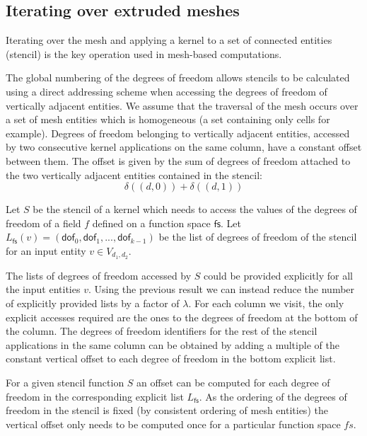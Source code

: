 \documentclass[11pt, a4paper]{scrartcl}
\begin{document}
\subsection{Iterating over extruded meshes}
\label{ssec:ext-mesh-iteration}

Iterating over the mesh and applying a kernel to a set of connected
entities (stencil) is the key operation used in mesh-based
computations.

The global numbering of the degrees of freedom allows stencils to be
calculated using a direct addressing scheme when accessing the degrees
of freedom of vertically adjacent entities. We assume that the
traversal of the mesh occurs over a set of mesh entities which is
homogeneous (a set containing only cells for example). Degrees of
freedom belonging to vertically adjacent entities, accessed by two
consecutive kernel applications on the same column, have a constant
offset between them. The offset is given by the sum of degrees of
freedom attached to the two vertically adjacent entities contained in
the stencil:
\begin{equation}
\delta((d, 0)) + \delta((d, 1))
\end{equation}

Let $S$ be the stencil of a kernel which needs to access the values of
the degrees of freedom of a field $f$ defined on a function space
$\mathsf{fs}$. Let
$L_{\mathsf{fs}}(v) = (\mathsf{dof}_{0}, \mathsf{dof}_{1}, ... ,
\mathsf{dof}_{k-1})$ be the list of degrees of freedom of the stencil
for an input entity $v \in V_{d_{1}, d_{2}}$.

The lists of degrees of freedom accessed by $S$ could be provided
explicitly for all the input entities $v$. Using the previous result
we can instead reduce the number of explicitly provided lists by a
factor of $\lambda$. For each column we visit, the only explicit
accesses required are the ones to the degrees of freedom at the bottom
of the column. The degrees of freedom identifiers for the rest of the
stencil applications in the same column can be obtained by adding a
multiple of the constant vertical offset to each degree of freedom in
the bottom explicit list.

For a given stencil function $S$ an offset can be computed for each
degree of freedom in the corresponding explicit list
$L_{\mathsf{fs}}$. As the ordering of the degrees of freedom in the
stencil is fixed (by consistent ordering of mesh entities) the
vertical offset only needs to be computed once for a particular
function space $fs$.
\end{document}
